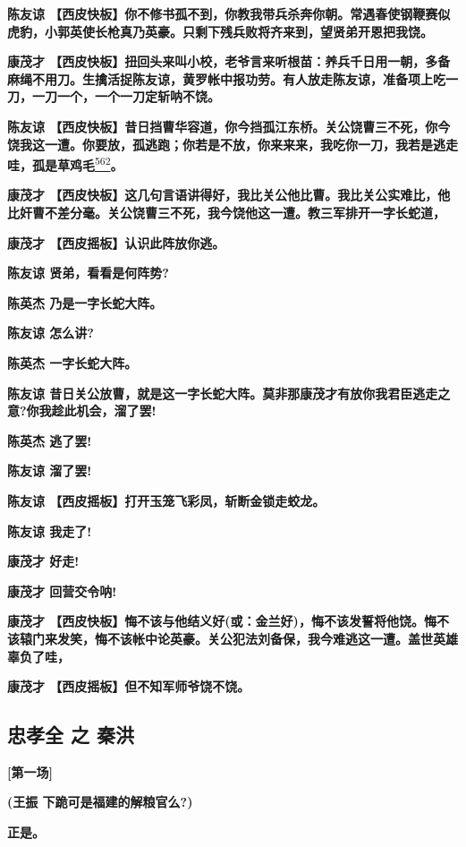 \textbf{陈友谅
【西皮快板】你不修书孤不到，你教我带兵杀奔你朝。常遇春使钢鞭赛似虎豹，小郭英使长枪真乃英豪。只剩下残兵败将齐来到，望贤弟开恩把我饶。}

\textbf{康茂才
【西皮快板】扭回头来叫小校，老爷言来听根苗：养兵千日用一朝，多备麻绳不用刀。生擒活捉陈友谅，黄罗帐中报功劳。有人放走陈友谅，准备项上吃一刀，一刀一个，一个一刀定斩呐不饶。}

\textbf{陈友谅
【西皮快板】昔日挡曹华容道，你今挡孤江东桥。关公饶曹三不死，你今饶我这一遭。你要放，孤逃跑；你若是不放，你来来来，我吃你一刀，我若是逃走哇，孤是草鸡毛}\protect\hyperlink{fn562}{\textsuperscript{562}}\textbf{。}

\textbf{康茂才
【西皮快板】这几句言语讲得好，我比关公他比曹。我比关公实难比，他比奸曹不差分毫。关公饶曹三不死，我今饶他这一遭。教三军排开一字长蛇道，}

\textbf{康茂才 【西皮摇板】认识此阵放你逃。}

\textbf{陈友谅 贤弟，看看是何阵势?}

\textbf{陈英杰 乃是一字长蛇大阵。}

\textbf{陈友谅 怎么讲?}

\textbf{陈英杰 一字长蛇大阵。}

\textbf{陈友谅
昔日关公放曹，就是这一字长蛇大阵。莫非那康茂才有放你我君臣逃走之意?你我趁此机会，溜了罢!}

\textbf{陈英杰 逃了罢!}

\textbf{陈友谅 溜了罢!}

\textbf{陈友谅 【西皮摇板】打开玉笼飞彩凤，斩断金锁走蛟龙。}

\textbf{陈友谅 我走了!}

\textbf{康茂才 好走!}

\textbf{康茂才 回营交令呐!}

\textbf{康茂才
【西皮快板】悔不该与他结义好(或：金兰好)，悔不该发誓将他饶。悔不该辕门来发笑，悔不该帐中论英豪。关公犯法刘备保，我今难逃这一遭。盖世英雄辜负了哇，}

\textbf{康茂才 【西皮摇板】但不知军师爷饶不饶。}

\hypertarget{ux5fe0ux5b5dux5168-ux4e4b-ux79e6ux6d2a}{%
\subsection{忠孝全 之
秦洪}\label{ux5fe0ux5b5dux5168-ux4e4b-ux79e6ux6d2a}}

\textbf{{[}第一场{]}}

\textbf{(王振 下跪可是福建的解粮官么?)}

\textbf{正是。}

